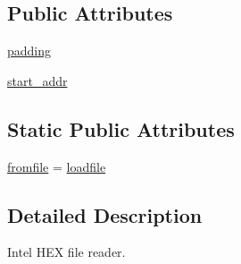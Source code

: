 \subsection*{Public Attributes}
\begin{DoxyCompactItemize}
\item 
\hyperlink{classsoftware_1_1chipwhisperer_1_1capture_1_1utils_1_1IntelHex_1_1IntelHex_af1b0c8c73d204cd8677cf6840511d3b0}{padding}
\item 
\hyperlink{classsoftware_1_1chipwhisperer_1_1capture_1_1utils_1_1IntelHex_1_1IntelHex_a5da95579a9d232f27b10682ef2422316}{start\+\_\+addr}
\end{DoxyCompactItemize}
\subsection*{Static Public Attributes}
\begin{DoxyCompactItemize}
\item 
\hyperlink{classsoftware_1_1chipwhisperer_1_1capture_1_1utils_1_1IntelHex_1_1IntelHex_aedb3e9ce405494ffb08bfd4051c9bcc7}{fromfile} = \hyperlink{classsoftware_1_1chipwhisperer_1_1capture_1_1utils_1_1IntelHex_1_1IntelHex_ad59eb04b61c35a525596bbfbef87329f}{loadfile}
\end{DoxyCompactItemize}


\subsection{Detailed Description}
\begin{DoxyVerb}Intel HEX file reader. \end{DoxyVerb}
 

